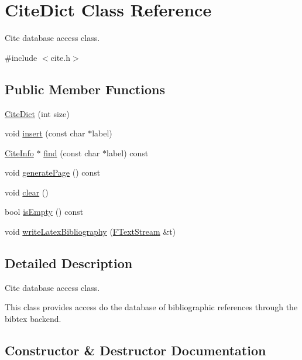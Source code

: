 \hypertarget{class_cite_dict}{}\section{Cite\+Dict Class Reference}
\label{class_cite_dict}


Cite database access class.  




{\ttfamily \#include $<$cite.\+h$>$}

\subsection*{Public Member Functions}
\begin{DoxyCompactItemize}
\item 
\mbox{\hyperlink{class_cite_dict_a7d6745b98d4566463c2aa12bbfa65f4e}{Cite\+Dict}} (int size)
\item 
void \mbox{\hyperlink{class_cite_dict_a1943f09412692299a6286a441ca1a01b}{insert}} (const char $\ast$label)
\item 
\mbox{\hyperlink{struct_cite_info}{Cite\+Info}} $\ast$ \mbox{\hyperlink{class_cite_dict_a6aadfa5a48551c3f34c64108f2e287ef}{find}} (const char $\ast$label) const
\item 
void \mbox{\hyperlink{class_cite_dict_a3c940a5ed5a06d90d9dc5471e900bb77}{generate\+Page}} () const
\item 
void \mbox{\hyperlink{class_cite_dict_a35183cd5038e60f747dd9ecd6bb64f73}{clear}} ()
\item 
bool \mbox{\hyperlink{class_cite_dict_aeede49a19664178463b094fecfa474dd}{is\+Empty}} () const
\item 
void \mbox{\hyperlink{class_cite_dict_a3b20f1fad3c4768501c7667ce73cacde}{write\+Latex\+Bibliography}} (\mbox{\hyperlink{class_f_text_stream}{F\+Text\+Stream}} \&t)
\end{DoxyCompactItemize}


\subsection{Detailed Description}
Cite database access class. 

This class provides access do the database of bibliographic references through the bibtex backend. 

\subsection{Constructor \& Destructor Documentation}
\mbox{\label{class_cite_dict_a7d6745b98d4566463c2aa12bbfa65f4e}} 
